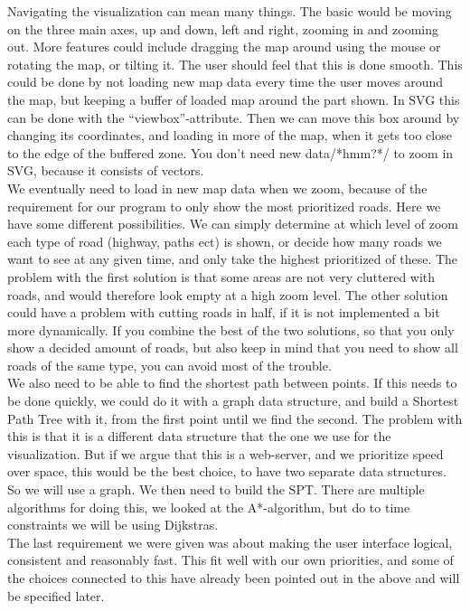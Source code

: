 \documentclass[a4paper,10pt,titlepage]{article}
\begin{document}
Navigating the visualization can mean many things. The basic would be moving on the three main axes, up and down, left and right, zooming in and zooming out. More features could include dragging the map around using the mouse or rotating the map, or tilting it. The user should feel that this is done smooth. This could be done by not loading new map data every time the user moves around the map, but keeping a buffer of loaded map around the part shown. In SVG this can be done with the “viewbox”-attribute. Then we can move this box around by changing its coordinates, and loading in more of the map, when it gets too close to the edge of the buffered zone. You don’t need new data/*hmm?*/ to zoom in SVG, because it consists of vectors.\\

We eventually need to load in new map data when we zoom, because of the requirement for our program to only show the most prioritized roads. Here we have some different possibilities. We can simply determine at which level of zoom each type of road (highway, paths ect) is shown, or decide how many roads we want to see at any given time, and only take the highest prioritized of these. The problem with the first solution is that some areas are not very cluttered with roads, and would therefore look empty at a high zoom level. The other solution could have a problem with cutting roads in half, if it is not implemented a bit more dynamically. If you combine the best of the two solutions, so that you only show a decided amount of roads, but also keep in mind that you need to show all roads of the same type, you can avoid most of the trouble.\\

We also need to be able to find the shortest path between points. If this needs to be done quickly, we could do it with a graph data structure, and build a Shortest Path Tree with it, from the first point until we find the second. The problem with this is that it is a different data structure that the one we use for the visualization. But if we argue that this is a web-server, and we prioritize speed over space, this would be the best choice, to have two separate data structures. So we will use a graph. We then need to build the SPT. There are multiple algorithms for doing this, we looked at the A*-algorithm, but do to time constraints we will be using Dijkstras.\\

The last requirement we were given was about making the user interface logical, consistent and reasonably fast. This fit well with our own priorities, and some of the choices connected to this have already been pointed out in the above and will be specified later.\\
\\
\end{document}
